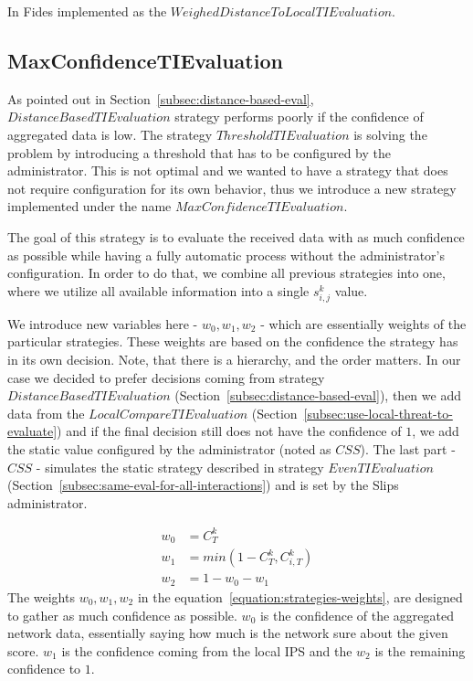 \noindent
In Fides implemented as the $WeighedDistanceToLocalTIEvaluation$.

\subsection{MaxConfidenceTIEvaluation}
\label{subsec:MaxConfidenceTIEvaluation}
As pointed out in Section~\ref{subsec:distance-based-eval},  $DistanceBasedTIEvaluation$ strategy performs poorly if the confidence of aggregated data is low.
The strategy $ThresholdTIEvaluation$ is solving the problem by introducing a threshold that has to be configured by the administrator. This is not optimal and we wanted to have a strategy that does not require configuration for its own behavior, thus we introduce a new strategy implemented under the name $MaxConfidenceTIEvaluation$.

The goal of this strategy is to evaluate the received data with as much confidence as possible while having a fully automatic process without the administrator's configuration.
In order to do that, we combine all previous strategies into one, where we utilize all available information into a single $s^{k}_{i, j}$ value.

We introduce new variables here - $w_{0}, w_{1}, w_{2}$ - which are essentially weights of the particular strategies. These weights are based on the confidence the strategy has in its own decision.
Note, that there is a hierarchy, and the order matters. 
In our case we decided to prefer decisions coming from strategy $DistanceBasedTIEvaluation$ (Section~\ref{subsec:distance-based-eval}), then we add data from the $LocalCompareTIEvaluation$ (Section~\ref{subsec:use-local-threat-to-evaluate}) and if the final decision still does not have the confidence of $1$, we add the static value configured by the administrator (noted as $CSS$). 
The last part - $CSS$ - simulates the static strategy described in strategy $EvenTIEvaluation$ (Section~\ref{subsec:same-eval-for-all-interactions}) and is set by the Slips administrator.

\begin{equation}
\label{equation:strategies-weights}
\begin{split}
    w_{0} &= {C}^{k}_{T} \\
    w_{1} &= min(1 - {C}^{k}_{T}, {C}^{k}_{i, T}) \\
    w_{2} &= 1 - w_{0} - w_{1}
\end{split}
\end{equation}
The weights $w_{0}, w_{1}, w_{2}$ in the equation~\ref{equation:strategies-weights}, are designed to gather as much confidence as possible. $w_{0}$ is the confidence of the aggregated network data, essentially saying how much is the network sure about the given score. 
$w_{1}$ is the confidence coming from the local IPS and the $w_{2}$ is the remaining confidence to $1$.

